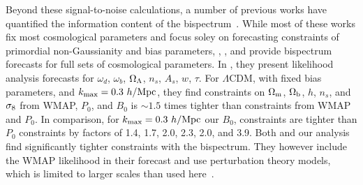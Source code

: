 Beyond these signal-to-noise calculations, a number of previous works 
have quantified the information content of the bispectrum~\citep{scoccimarro2004, sefusatti2006, sefusatti2007, song2015, tellarini2016, yamauchi2017a, karagiannis2018, yankelevich2019, chudaykin2019, coulton2019}. 
While most of these works fix most cosmological parameters and focus soley 
on forecasting constraints of primordial non-Gaussianity and bias parameters, 
\cite{sefusatti2006}, \cite{yankelevich2019}, and \cite{chudaykin2019} provide 
bispectrum forecasts for full sets of cosmological parameters. In \cite{sefusatti2006}, 
they present likelihood analysis forecasts for $\omega_d$, $\omega_b$, $\Omega_\Lambda$, 
$n_s$, $A_s$, $w$, $\tau$. %
For $\Lambda$CDM, with fixed bias parameters, and $k_{\rm max} = 0.3~h/{\rm Mpc}$, 
they find constraints on $\Omega_{\rm m}$, $\Omega_{\rm b}$, $h$, $n_s$, and $\sigma_8$ from WMAP, 
$P_0$, and $B_0$ is $\sim 1.5$ times tighter than constraints from WMAP 
and $P_0$. In comparison, for 
$k_{\rm max} = 0.3~h/{\rm Mpc}$ our $B_0$, constraints are tighter than $P_0$ constraints 
by factors of 1.4, 1.7, 2.0, 2.3, 2.0, and 3.9. Both \cite{sefusatti2006} and our 
analysis find significantly tighter constraints with the bispectrum. 
They however include the WMAP likelihood in their forecast and use 
perturbation theory models, which is limited to larger scales than used 
here~\citep{scoccimarro1998a, scoccimarro1999a, sefusatti2010, pollack2012, gil-marin2014, lazanu2016, eggemeier2019}.

